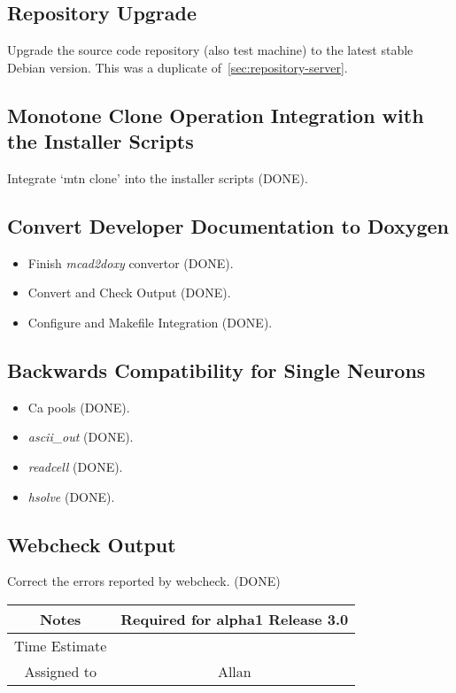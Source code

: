 \documentclass[12pt]{article}
\begin{document}
\subsection{Repository Upgrade}

Upgrade the source code repository (also test machine) to the latest
stable Debian version.  This was a duplicate
of~\ref{sec:repository-server}.


\subsection{Monotone Clone Operation Integration with the Installer Scripts}
Integrate `mtn clone' into the installer scripts (DONE).

\subsection{Convert Developer Documentation to Doxygen}

\begin{itemize}
\item Finish {\it mcad2doxy} convertor (DONE).
\item Convert and Check Output (DONE).
\item Configure and Makefile Integration (DONE).
\end{itemize}

\subsection{Backwards Compatibility for Single Neurons}

\begin{itemize}
\item Ca pools (DONE).
\item {\it ascii\_out} (DONE).
\item {\it readcell} (DONE).
\item {\it hsolve} (DONE).
\end{itemize}


\subsection{Webcheck Output}

Correct the errors reported by webcheck. (DONE)

{
  \vspace{5mm}
  \centering
  \begin{tabular}{|c|c|}
    \hline
    Notes
    & Required for alpha1 Release 3.0 \\
    \hline
    Time Estimate
    & \\
    \hline
    Assigned to
    & Allan \\
    \hline
  \end{tabular}
}
\end{document}
